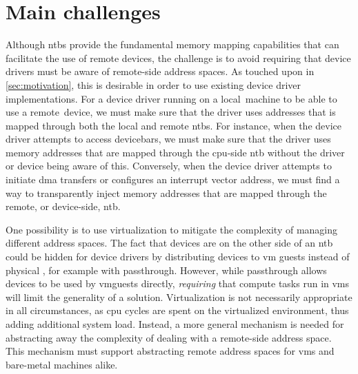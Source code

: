 \section{Main challenges}\label{sec:challenges}
Although \glspl{ntb} provide the fundamental memory mapping capabilities that can facilitate the use of remote devices, the challenge is to avoid requiring that device drivers must be aware of remote-side address spaces.
%
As touched upon in \cref{sec:motivation}, this is desirable in order to use existing device driver implementations.
%
For a device driver running on a local~machine to be able to use a remote~device, we must make sure that the driver uses addresses that is mapped through both the local and remote \glspl{ntb}.
%
For instance, when the device driver attempts to access \glspl{devicebar}, we must make sure that the driver uses memory addresses that are mapped through the \gls{cpu}-side \gls{ntb} without the driver or device being aware of this.
%
Conversely, when the device driver attempts to initiate \gls{dma} transfers or configures an interrupt vector address, we must find a way to transparently inject memory addresses that are mapped through the remote, or device-side, \gls{ntb}.



One possibility is to use virtualization to mitigate the complexity of managing different address spaces.
%
The fact that devices are on the other side of an \gls{ntb} could be hidden for device drivers by distributing devices to \gls{vm} \glspl{guest} instead of physical , for example with \gls{passthrough}.
%
However, while \gls{passthrough} allows devices to be used by \glspl{vmguest} directly, \emph{requiring} that compute tasks run in \glspl{vm} will limit the generality of a solution.
%
Virtualization is not necessarily appropriate in all circumstances, as \gls{cpu} cycles are spent on  the virtualized environment, thus adding additional system load.
%
Instead, a more general mechanism is needed for abstracting away the complexity of dealing with a remote-side address space.
%
This mechanism must support abstracting remote address spaces for \glspl{vm} and bare-metal machines alike.



